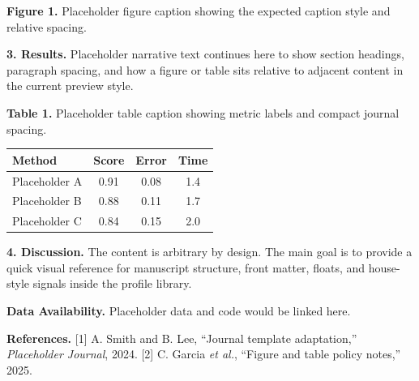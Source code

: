\documentclass[10pt,a4paper]{article}
\begin{document}
\begin{center}\end{center}\noindent\textbf{Figure 1.} Placeholder figure caption showing the expected caption style and relative spacing.\par\vspace{0.5em}

\textbf{3. Results.} Placeholder narrative text continues here to show section headings, paragraph spacing, and how a figure or table sits relative to adjacent content in the current preview style.

\noindent\textbf{Table 1.} Placeholder table caption showing metric labels and compact journal spacing.\par\begin{center}
\begin{tabular}{lccc}
\toprule
Method & Score & Error & Time\\
\midrule
Placeholder A & 0.91 & 0.08 & 1.4\\
Placeholder B & 0.88 & 0.11 & 1.7\\
Placeholder C & 0.84 & 0.15 & 2.0\\
\bottomrule
\end{tabular}\end{center}\vspace{0.5em}

\textbf{4. Discussion.} The content is arbitrary by design. The main goal is to provide a quick visual reference for manuscript structure, front matter, floats, and house-style signals inside the profile library.


\noindent \textbf{Data Availability.} Placeholder data and code would be linked here.\par
\vspace{0.5em}
\noindent \textbf{References.} [1] A. Smith and B. Lee, ``Journal template adaptation,'' \textit{Placeholder Journal}, 2024. [2] C. Garcia \textit{et al.}, ``Figure and table policy notes,'' 2025.\par
\vspace{0.6em}
\end{document}
